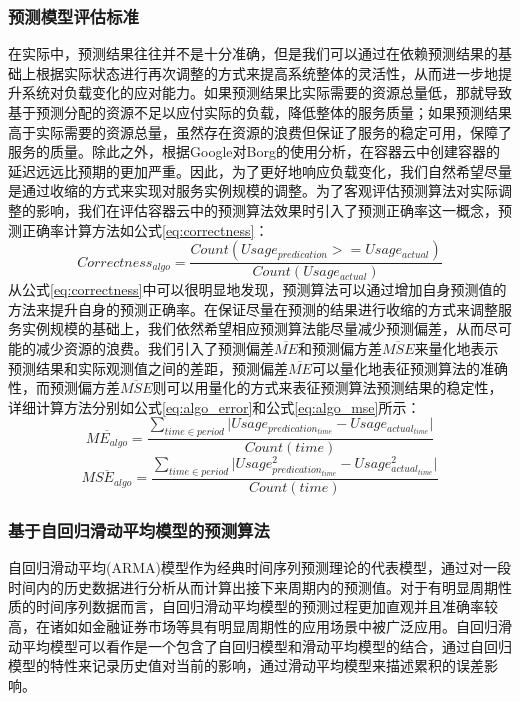 \subsubsection{预测模型评估标准}
在实际中，预测结果往往并不是十分准确，但是我们可以通过在依赖预测结果的基础上根据实际状态进行再次调整的方式来提高系统整体的灵活性，从而进一步地提升系统对负载变化的应对能力。如果预测结果比实际需要的资源总量低，那就导致基于预测分配的资源不足以应付实际的负载，降低整体的服务质量；如果预测结果高于实际需要的资源总量，虽然存在资源的浪费但保证了服务的稳定可用，保障了服务的质量。除此之外，根据Google对Borg的使用分析，在容器云中创建容器的延迟远远比预期的更加严重\cite{verma2015large}。因此，为了更好地响应负载变化，我们自然希望尽量是通过收缩的方式来实现对服务实例规模的调整。为了客观评估预测算法对实际调整的影响，我们在评估容器云中的预测算法效果时引入了预测正确率这一概念，预测正确率计算方法如公式\ref{eq:correctness}：
\begin{equation}\label{eq:correctness}
Correctness_{algo} = \frac{Count(Usage_{predication} >= Usage_{actual})}{Count(Usage_{actual})}
\end{equation}
从公式\ref{eq:correctness}中可以很明显地发现，预测算法可以通过增加自身预测值的方法来提升自身的预测正确率。在保证尽量在预测的结果进行收缩的方式来调整服务实例规模的基础上，我们依然希望相应预测算法能尽量减少预测偏差，从而尽可能的减少资源的浪费。我们引入了预测偏差$\overline{ME}$和预测偏方差$\overline{MSE}$来量化地表示预测结果和实际观测值之间的差距，预测偏差$\overline{ME}$可以量化地表征预测算法的准确性，而预测偏方差$\overline{MSE}$则可以用量化的方式来表征预测算法预测结果的稳定性，详细计算方法分别如公式\ref{eq:algo_error}和公式\ref{eq:algo_mse}所示：
\begin{equation}\label{eq:algo_error}
\overline{ME_{algo}} = \frac{\sum_{time \in period} {\vert Usage_{predication_{time}} - Usage_{actual_{time}}\vert}}{Count(time)}
\end{equation}
\begin{equation}\label{eq:algo_mse}
\overline{MSE_{algo}} = \frac{\sum_{time \in period} {\vert Usage_{predication_{time}}^{2} - Usage_{actual_{time}}^{2}\vert}}{Count(time)}
\end{equation}

\subsubsection{基于自回归滑动平均模型的预测算法}
自回归滑动平均(ARMA)模型作为经典时间序列预测理论的代表模型，通过对一段时间内的历史数据进行分析从而计算出接下来周期内的预测值。对于有明显周期性质的时间序列数据而言，自回归滑动平均模型的预测过程更加直观并且准确率较高，在诸如如金融证券市场等具有明显周期性的应用场景中被广泛应用。自回归滑动平均模型可以看作是一个包含了自回归模型和滑动平均模型的结合，通过自回归模型的特性来记录历史值对当前的影响，通过滑动平均模型来描述累积的误差影响。

